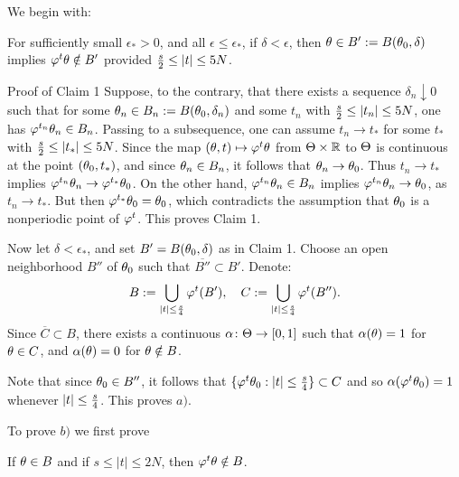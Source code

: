 \begin{pf}  We begin with:

\begin{claimone}  For sufficiently small
$\epsilon_{*} > 0$, and all $\epsilon \le \epsilon_{*}$,
if $\delta<\epsilon$, then
 $\theta\in B':=B(\theta_0,\delta)$ implies $\varphi^t\theta\notin B'$
 provided ${s\over 2} \le |t|\le 5N$.
\end{claimone}

\begin{pf*}{Proof of Claim 1}    Suppose, to the contrary,
that there exists a sequence $\delta_n\downarrow 0$ such that
for some $\theta_n \in B_n:=B(\theta_0,\delta_n)$ and some $t_n$ with
${s \over 2} \le |t_n| \le 5N$, one has
$\varphi^{t_{n}}\theta_n \in B_n$. Passing to a subsequence, one can
assume $t_n \to t_{*}$ for some $t_{*}$ with
${s\over 2} \le |t_{*}| \le 5N$.  Since the map
$(\theta,t) \mapsto \varphi^t\theta$ from $\Theta\times{\Bbb{R}}$ to $\Theta$
is continuous at the point $(\theta_0, t_{*})$, and since
$\theta_n\in B_n$, it follows that $\theta_n\to \theta_0$.
Thus $t_n\to t_{*}$ implies $\varphi^{t_{n}}\theta_n\to
\varphi^{t_{*}}\theta_0$.  On the other hand,
$\varphi^{t_{n}}\theta_n \in B_n$ implies $\varphi^{t_{n}}\theta_n\to \theta_0$,
as  $t_n\to t_{*}$.
But then  $\varphi^{t_{*}} \theta_0=\theta_0$,
which contradicts the assumption that $\theta_0$ is a nonperiodic
point of $\varphi^t$.  This proves Claim 1.
\end{pf*}

Now let $\delta<\epsilon_{*}$, and set $B'=B(\theta_0,\delta)$ as in
Claim 1.  Choose an open neighborhood $B''$ of $\theta_0$
such that $\overline{B''} \subset B'$.  Denote:
\begin{equation}\lb{defBC}
 B:=\bigcup_{|t|\le {s\over 4}} \vphi^t(B'),\quad
 C:=\bigcup_{|t|\le {s\over 4}} \vphi^t(B'').
\end{equation}
Since $\overline{C} \subset B$, there exists a continuous
$\alpha\colon \Theta\to [0,1]$ such that $\alpha(\theta)=1$ for $\theta\in C$,
and $\alpha(\theta)=0$ for $\theta\notin B$.

Note that since $\theta_0 \in B''$, it follows that
$\{\varphi^t\theta_0: |t|\le{s\over 4}\} \subset C$ and so
$\alpha(\varphi^t\theta_0) =1$ whenever $|t|\le {s\over 4}$.
This proves $a)$.

To prove $b)$ we first prove

\begin{claimtwo} If $\theta\in B$ and if $s\le |t|\le 2N$,
then $\varphi^t\theta\notin B$.
\end{claimtwo}


\end{pf}
